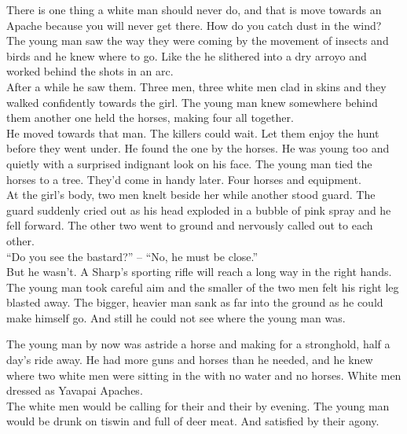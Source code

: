 There is one thing a white man should never do, and that is move towards an Apache because you will never get there. How do you catch dust in the wind? The young man saw the way they were coming by the movement of insects and birds and he knew where to go. Like the  he slithered into a dry arroyo and worked behind the shots in an arc. \\

After a while he saw them. Three men, three white men clad in skins and they walked confidently towards the girl. The young man knew somewhere behind them another one held the horses, making four all together. \\

He moved towards that man. The killers could wait. Let them enjoy the hunt before they went under. He found the one by the horses. He was young too and  quietly with a surprised indignant look on his face. The young man tied the horses to a tree. They'd come in handy later. Four horses and equipment. \\

At the girl's body, two men knelt beside her while another stood guard. The guard suddenly cried out as his head exploded in a bubble of pink spray and he fell forward. The other two went to ground and nervously called out to each other. \\

``Do you see the bastard?'' -- ``No, he must be close.'' \\

But he wasn't. A Sharp's sporting rifle will reach a long way in the right hands. The young man took careful aim and the smaller of the two men felt his right leg blasted away. The bigger, heavier man sank as far into the ground as he could make himself go. And still he could not see where the young man was. \\




The young man by now was astride a horse and making for a  stronghold, half a day's ride away. He had more guns and horses than he needed, and he knew where two white men were sitting in the  with no water and no horses. White men dressed as Yavapai Apaches. \\

The white men would be calling for their  and their  by evening. The young man would be drunk on tiswin and full of deer meat. And satisfied by their agony. \\
